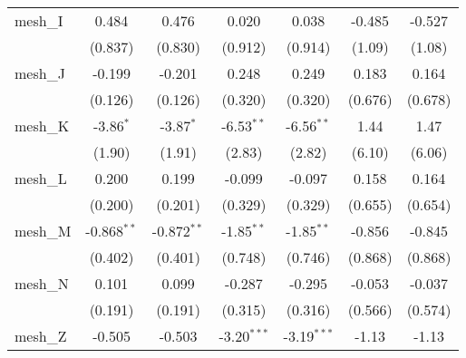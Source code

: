 \begin{tabular}{lcccccc}
   mesh\_I                                                     & 0.484          & 0.476          & 0.020          & 0.038          & -0.485        & -0.527\\   
                                                               & (0.837)        & (0.830)        & (0.912)        & (0.914)        & (1.09)        & (1.08)\\   
   mesh\_J                                                     & -0.199         & -0.201         & 0.248          & 0.249          & 0.183         & 0.164\\   
                                                               & (0.126)        & (0.126)        & (0.320)        & (0.320)        & (0.676)       & (0.678)\\   
   mesh\_K                                                     & -3.86$^{*}$    & -3.87$^{*}$    & -6.53$^{**}$   & -6.56$^{**}$   & 1.44          & 1.47\\   
                                                               & (1.90)         & (1.91)         & (2.83)         & (2.82)         & (6.10)        & (6.06)\\   
   mesh\_L                                                     & 0.200          & 0.199          & -0.099         & -0.097         & 0.158         & 0.164\\   
                                                               & (0.200)        & (0.201)        & (0.329)        & (0.329)        & (0.655)       & (0.654)\\   
   mesh\_M                                                     & -0.868$^{**}$  & -0.872$^{**}$  & -1.85$^{**}$   & -1.85$^{**}$   & -0.856        & -0.845\\   
                                                               & (0.402)        & (0.401)        & (0.748)        & (0.746)        & (0.868)       & (0.868)\\   
   mesh\_N                                                     & 0.101          & 0.099          & -0.287         & -0.295         & -0.053        & -0.037\\   
                                                               & (0.191)        & (0.191)        & (0.315)        & (0.316)        & (0.566)       & (0.574)\\   
   mesh\_Z                                                     & -0.505         & -0.503         & -3.20$^{***}$  & -3.19$^{***}$  & -1.13         & -1.13\\   

\end{tabular}
